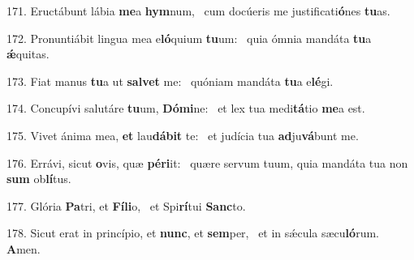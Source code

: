 171. Eructábunt lábia \textbf{me}a \textbf{hym}num, \ast\  cum docúeris me justificati\textbf{ó}nes \textbf{tu}as.\

172. Pronuntiábit lingua mea e\textbf{ló}quium \textbf{tu}um: \ast\  quia ómnia mandáta \textbf{tu}a \textbf{ǽ}quitas.\

173. Fiat manus \textbf{tu}a ut \textbf{sal}\textbf{vet} me: \ast\  quóniam mandáta \textbf{tu}a e\textbf{lé}gi.\

174. Concupívi salutáre \textbf{tu}um, \textbf{Dó}\textbf{mi}ne: \ast\  et lex tua medi\textbf{tá}tio \textbf{me}a est.\

175. Vivet ánima mea, \textbf{et} lau\textbf{dá}\textbf{bit} te: \ast\  et judícia tua \textbf{ad}ju\textbf{vá}bunt me.\

176. Errávi, sicut \textbf{o}vis, quæ \textbf{pér}\textbf{i}it: \ast\  quære servum tuum, quia mandáta tua non \textbf{sum} ob\textbf{lí}tus.\

177. Glória \textbf{Pa}tri, et \textbf{Fí}\textbf{li}o, \ast\  et Spi\textbf{rí}tui \textbf{Sanc}to.\

178. Sicut erat in princípio, et \textbf{nunc}, et \textbf{sem}per, \ast\  et in sǽcula sæcu\textbf{ló}rum. \textbf{A}men.\

